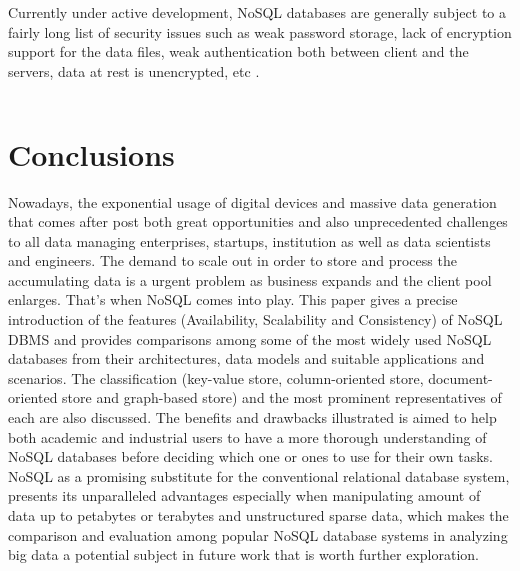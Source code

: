 Currently under active development,
NoSQL databases are generally subject to a fairly long list of security issues such as weak password storage, lack of encryption support for the data files, weak authentication both between client and the servers, data at rest is unencrypted, etc \cite{deka2014handbook}.

\[\]

\section{Conclusions}

Nowadays, the exponential usage of digital devices and massive data generation that comes after post both great opportunities and also unprecedented challenges to all data managing enterprises, startups, institution as well as data scientists and engineers.
The demand to scale out in order to store and process the accumulating data is a urgent problem as business expands and the client pool enlarges. That's when NoSQL comes into play. This paper gives a precise introduction of the  features (Availability, Scalability and Consistency) of NoSQL DBMS and provides comparisons among some of the most widely used NoSQL databases from their architectures, data models and suitable applications and scenarios. The classification (key-value store, column-oriented store, document-oriented store and graph-based store) and the most prominent representatives of each are also discussed. The benefits and drawbacks illustrated is aimed to help both academic and industrial users to have a more thorough understanding of NoSQL databases before deciding which one or ones to use for their own tasks. NoSQL as a promising substitute for the conventional relational database system, presents its unparalleled advantages especially when manipulating amount of data up to petabytes or terabytes and unstructured sparse data, which makes the comparison and evaluation among popular NoSQL database systems in analyzing big data a potential subject in future work that is worth further exploration. 

\[\]
